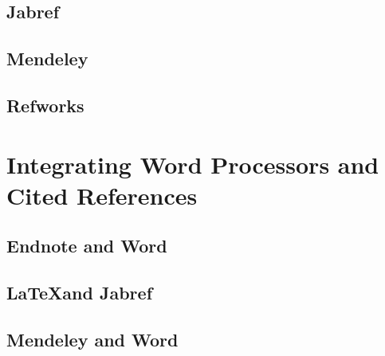 \documentclass{article}\usepackage[]{graphicx}\usepackage[]{color}
\begin{document}
\subsection{Jabref}

\subsection{Mendeley}

\subsection{Refworks}

\section{Integrating Word Processors and Cited References}

\subsection{Endnote and Word}

\subsection{\LaTeX and Jabref}

\subsection{Mendeley and Word}
\end{document}
